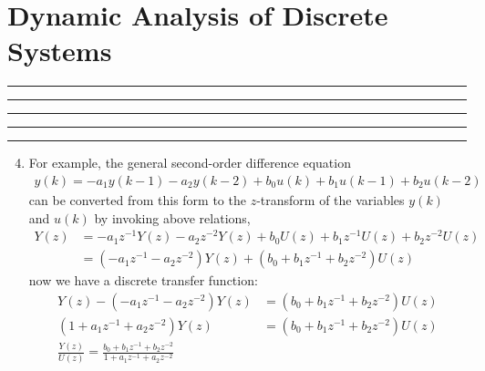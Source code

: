 \setcounter{chapter}{7}
\setcounter{section}{1}
\section{Dynamic Analysis of Discrete Systems}
\vspace{-8pt} \hrule \hrule \hrule \hrule \hrule  \vspace{12pt}

	\begin{enumerate}	
		\setcounter{enumi}{3}
		\item For example, the general second-order difference equation 
		\begin{align*}
			y(k) = -a_1 y(k-1) - a_2 y(k-2) + b_0 u(k) + b_1 u(k-1) + b_2 u(k-2) 
		\end{align*}
		can be converted from this form to the $z$-transform of the variables $y(k)$ and $u(k)$ by invoking above relations,
		\begin{align*}
			Y(z) &= -a_1 z^{-1} Y(z) -a_2 z^{-2} Y(z) + b_0 U(z) + b_1 z^{-1} U(z) + b_2 z^{-2} U(z)\\
			     &= (-a_1 z^{-1} - a_2 z^{-2}) Y(z) + (b_0 + b_1 z^{-1} + b_2 z^{-2}) U(z) 
		\end{align*}
		now we have a discrete transfer function:
		\begin{align*}
			Y(z) - (-a_1 z^{-1} - a_2 z^{-2}) Y(z) &= (b_0 + b_1 z^{-1} + b_2 z^{-2}) U(z) \\
			(1 +a_1 z^{-1} + a_2 z^{-2}) Y(z) &= (b_0 + b_1 z^{-1} + b_2 z^{-2}) U(z) \\
			\frac{Y(z)}{U(z)} = \frac{b_0 + b_1 z^{-1} + b_2 z^{-2}}{1 + a_1 z^{-1} + a_2 z^{-2}} 
		\end{align*}

	\end{enumerate}	